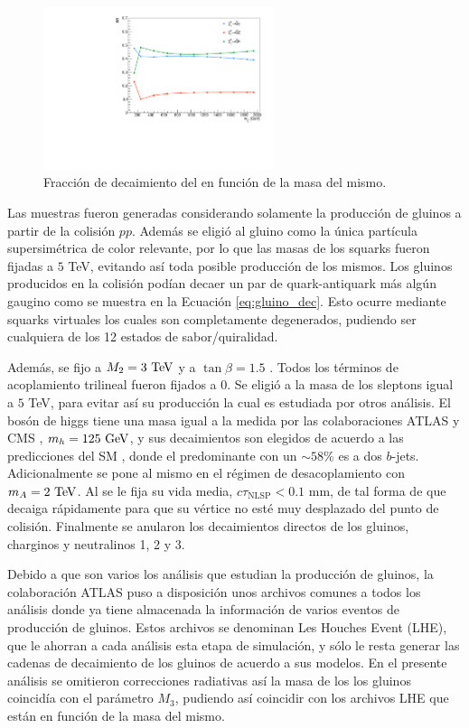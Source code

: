 \begin{figure}
  \centering
  \includegraphics[width=0.6\textwidth]{images/analysis/phb_n1_br.pdf}
  \caption{Fracción de decaimiento del \ninoone en función de la masa del mismo.}
  \label{fig:n1_br}
\end{figure}

Las muestras fueron generadas considerando solamente la producción de gluinos a partir de la colisión $pp$. Además se eligió al gluino como la única partícula supersimétrica de color relevante, por lo que las masas de los squarks fueron fijadas a $5$ TeV, evitando así toda posible producción de los mismos. Los gluinos producidos en la colisión podían decaer un par de quark-antiquark más algún gaugino como se muestra en la Ecuación \ref{eq:gluino_dec}. Esto ocurre mediante squarks virtuales los cuales son completamente degenerados, pudiendo ser cualquiera de los 12 estados de sabor/quiralidad.

Además, se fijo a $M_2=3\ \text{TeV}$ y a $\tan{\beta}=1.5$ . Todos los términos de acoplamiento trilineal fueron fijados a 0. Se eligió a la masa de los sleptons igual a $5$ TeV, para evitar así su producción la cual es estudiada por otros análisis. El bosón de higgs tiene una masa igual a la medida por las colaboraciones ATLAS y CMS \cite{higgs_mass}, $m_h=125\ \gev$, y sus decaimientos son elegidos de acuerdo a las predicciones del SM , donde el predominante con un $\sim58$\% es a dos $b$-jets.
Adicionalmente se pone al mismo en el régimen de desacoplamiento con $m_A = 2\ \text{TeV}$. Al \ninoone se le fija su vida media, $c\tau_{\text{NLSP}}<0.1$ mm, de tal forma de que decaiga rápidamente  para que su vértice no esté muy desplazado del punto de colisión. Finalmente se anularon los decaimientos directos de los gluinos, charginos y neutralinos 1, 2 y 3. 

Debido a que son varios los análisis que estudian la producción de gluinos, la colaboración ATLAS puso a disposición unos archivos comunes a todos los análisis donde ya tiene almacenada la información de varios eventos de producción de gluinos. Estos archivos se denominan Les Houches Event (LHE), que le ahorran a cada análisis esta etapa de simulación, y sólo le resta generar las cadenas de decaimiento de los gluinos de acuerdo a sus modelos. En el presente análisis se omitieron correcciones radiativas así la masa de los los gluinos coincidía con el parámetro $M_3$, pudiendo así coincidir con los archivos LHE que están en función de la masa del mismo.

